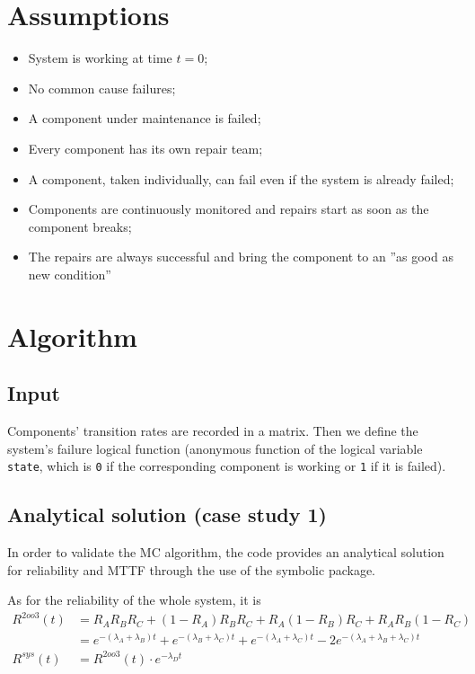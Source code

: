 \documentclass[a4paper,11pt]{article}
\begin{document}
\section{Assumptions}

\begin{itemize}
    \item System is working at time $t=0$;
    \item No common cause failures;
    \item A component under maintenance is failed;
    \item Every component has its own repair team;
    \item A component, taken individually, can fail even if the system is
    already failed;
    \item Components are continuously monitored and repairs start as soon as the
    component breaks;
    \item The repairs are always successful and bring the component to an ”as
    good as new condition”
\end{itemize}

\section{Algorithm}

\subsection{Input}

Components' transition rates are recorded in a matrix. Then we define the
system's failure logical function (anonymous function of the logical variable
\texttt{state}, which is \texttt{0} if the corresponding component is working or
\texttt{1} if it is failed).

\subsection{Analytical solution (case study 1)}

In order to validate the MC algorithm, the code provides an analytical solution
for reliability and MTTF through the use of the symbolic package.

\hspace{2em}

As for the reliability of the whole system, it is
\begin{align*}
    R^{2oo3}(t) &= R_A R_B R_C + (1-R_A)R_B R_C + R_A(1-R_B)R_C + R_A R_B(1-R_C) \\
    &= e^{-(\lambda_A+\lambda_B)t} +
    e^{-(\lambda_B+\lambda_C)t} +
    e^{-(\lambda_A+\lambda_C)t} -
    2e^{-(\lambda_A+\lambda_B+\lambda_C)t} \\
    R^{sys}(t) &= R^{2oo3}(t) \cdot e^{-\lambda_D t}
\end{align*}
\end{document}
